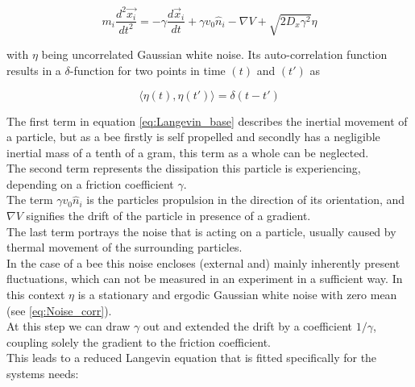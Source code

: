
\begin{equation}
\label{eq:Langevin_base}
    m_{i}\frac{d^{2} \vec{x_{i}}}{d t^{2}} = -\gamma\frac{d \vec{x}_{i}}{d t} + \gamma v_{0} \hat{n}_{i} - \nabla V + \sqrt{2 D_{x} \gamma^{2}}\eta
\end{equation}


with $\eta$ being uncorrelated Gaussian white noise. Its auto-correlation function results in a $\delta$-function for two points in time $(t)$ and $(t')$ as

\begin{equation}
\label{eq:Noise_corr}
    \langle \eta(t), \eta(t') \rangle = \delta(t-t')
\end{equation}

The first term in equation \ref{eq:Langevin_base} describes the inertial movement of a particle, but as a bee firstly is self propelled and secondly has a negligible inertial mass of a tenth of a gram, this term as a whole can be neglected.
\\
The second term represents the dissipation this particle is experiencing, depending on a friction coefficient $\gamma$.
\\
The term $\gamma v_{0} \hat{n}_{i}$ is the particles propulsion in the direction of its orientation, and $\nabla V$ signifies the drift of the particle in presence of a gradient.
\\
The last term portrays the noise that is acting on a particle, usually caused by thermal movement of the surrounding particles.
\\
In the case of a bee this noise encloses (external and) mainly inherently present fluctuations, which can not be measured in an experiment in a sufficient way. In this context $\eta$ is a stationary and ergodic Gaussian white noise with zero mean (see \ref{eq:Noise_corr}).
\\
At this step we can draw $\gamma$ out and extended the drift by a coefficient $1/\gamma$, coupling solely the gradient to the friction coefficient.
\\
This leads to a reduced Langevin equation that is fitted specifically for the systems needs:

